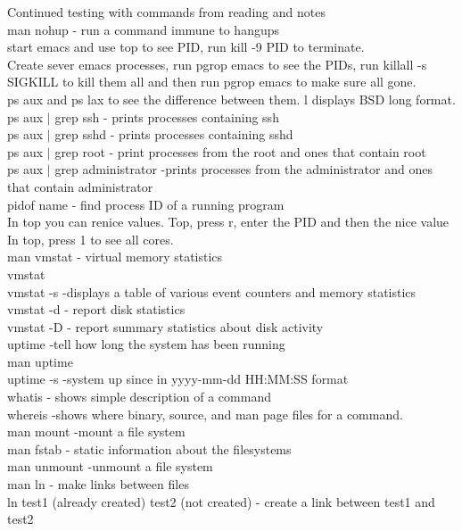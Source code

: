 \documentclass{article}
\begin{document}
Continued testing with commands from reading and notes\\
man nohup - run a command immune to hangups\\
start emacs and use top to see PID, run kill -9 PID to terminate.\\
Create sever emacs processes, run pgrop emacs to see the PIDs, run killall -s SIGKILL to kill them all and then run pgrop emacs to make sure all gone.\\
ps aux and ps lax to see the difference between them. l displays BSD long format.\\
ps aux $|$ grep ssh - prints processes containing ssh\\
ps aux $|$ grep sshd - prints processes containing sshd\\
ps aux $|$ grep root - print processes from the root and ones that contain root\\
ps aux $|$ grep administrator -prints processes from the administrator and ones that contain administrator\\
pidof name - find process ID of a running program\\
In top you can renice values. Top, press r, enter the PID and then the nice value\\
In top, press 1 to see all cores.\\
man vmstat - virtual memory statistics\\
vmstat\\
vmstat -s -displays a table of various event counters and memory statistics\\
vmstat -d - report disk statistics\\
vmstat -D - report summary statistics about disk activity\\
uptime -tell how long the system has been running\\
man uptime\\
uptime -s -system up since in yyyy-mm-dd HH:MM:SS format\\
whatis - shows simple description of a command\\
whereis -shows where binary, source, and man page files for a command.\\
man mount -mount a file system\\
man fstab - static information about the filesystems\\
man unmount -unmount a file system\\
man ln - make links between files\\
ln test1 (already created) test2 (not created) - create a link between test1 and test2\\
\end{document}
